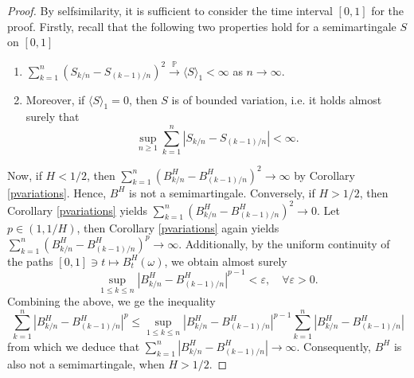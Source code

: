 \begin{proof}
    By selfsimilarity, it is sufficient to consider the time interval $[0,1]$ for the proof. Firstly, recall that the following two properties hold for a semimartingale $S$ on $[0,1]$
    \begin{enumerate}
        \item $\sum_{k=1}^{n}\left(S_{k/n}-S_{(k-1)/n}\right)^{2}\overset{\mathbb{P}}{\to} \langle S\rangle_{1}<\infty$ as $n\to\infty$.
        \item Moreover, if $\langle S\rangle_{1}=0$, then $S$ is of bounded variation, i.e. it holds almost surely that
        \begin{equation}
            \sup_{n\geq 1}\sum_{k=1}^{n}|S_{k/n}-S_{(k-1)/n}|<\infty. 
        \end{equation}
    \end{enumerate}
    Now, if $H<1/2$, then $\sum_{k=1}^{n}(B_{k/n}^{H}-B_{(k-1)/n}^{H})^{2}\to \infty$ by Corollary \ref{pvariations}. Hence, $B^H$ is not a semimartingale. Conversely, if $H>1/2$, then Corollary \ref{pvariations} yields $\sum_{k=1}^{n}(B_{k/n}^{H}-B_{(k-1)/n}^{H})^{2}\to 0$. Let $p\in (1,1/H)$, then Corollary \ref{pvariations} again yields $\sum_{k=1}^{n}(B_{k/n}^{H}-B_{(k-1)/n}^{H})^{p}\to \infty$. Additionally, by the uniform continuity of the paths $[0,1]\ni t\mapsto B_{t}^{H}(\omega)$, we obtain almost surely
    \begin{equation}
        \sup_{1\leq k\leq n}|B_{k/n}^{H}-B_{(k-1)/n}^{H}|^{p-1}<\varepsilon, \quad \forall \varepsilon>0.
    \end{equation}
    Combining the above, we ge the inequality
    \begin{equation}
        \sum_{k=1}^{n}\left|B_{k/n}^{H}-B_{(k-1)/n}^{H}\right|^{p}\leq \sup_{1\leq k\leq n}|B_{k/n}^{H}-B_{(k-1)/n}^{H}|^{p-1}\sum_{k=1}^{n}\left|B_{k/n}^{H}-B_{(k-1)/n}^{H}\right|
    \end{equation}
    from which we deduce that $\sum_{k=1}^{n}|B_{k/n}^{H}-B_{(k-1)/n}^{H}|\to \infty$. Consequently, $B^H$ is also not a semimartingale, when $H>1/2$.
\end{proof}
